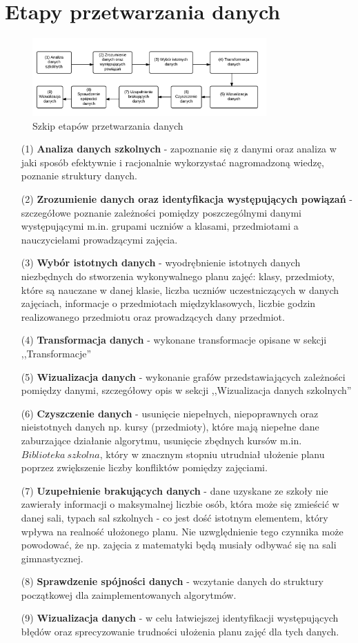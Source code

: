 \section{Etapy przetwarzania danych}
\begin{figure}[H]
  \centering
    \includegraphics[width=0.8\textwidth]{proces_przetwarzania.png}
  \caption{Szkip etapów przetwarzania danych}
\end{figure}
\begin{enumerate}
\item[(1)] \textbf{Analiza danych szkolnych} - zapoznanie się z danymi oraz analiza w jaki sposób efektywnie i racjonalnie wykorzystać nagromadzoną wiedzę, poznanie struktury danych.
\item[(2)] \textbf{Zrozumienie danych oraz identyfikacja występujących powiązań} - szczegółowe poznanie zależności pomiędzy poszczególnymi danymi występującymi m.in. grupami uczniów a klasami, przedmiotami a nauczycielami prowadzącymi zajęcia.
\item[(3)] \textbf{Wybór istotnych danych} - wyodrębnienie istotnych danych niezbędnych do stworzenia wykonywalnego planu zajęć: klasy, przedmioty, które są nauczane w danej klasie, liczba uczniów uczestniczących w danych zajęciach, informacje o przedmiotach międzyklasowych, liczbie godzin realizowanego przedmiotu oraz prowadzących dany przedmiot.
\item[(4)] \textbf{Transformacja danych} - wykonane transformacje opisane w sekcji ,,Transformacje''
\item[(5)] \textbf{Wizualizacja danych} - wykonanie grafów przedstawiających zależności pomiędzy danymi, szczegółowy opis w sekcji ,,Wizualizacja danych szkolnych''
\item[(6)] \textbf{Czyszczenie danych}  - usunięcie niepełnych, niepoprawnych oraz nieistotnych danych np. kursy (przedmioty), które mają niepełne dane zaburzające działanie algorytmu, usunięcie zbędnych kursów m.in. $Biblioteka\ szkolna$, który w znacznym stopniu utrudniał ułożenie planu poprzez zwiększenie liczby konfliktów pomiędzy zajęciami.
\item[(7)] \textbf{Uzupełnienie brakujących danych} - dane uzyskane ze szkoły nie zawierały informacji o maksymalnej liczbie osób, która może się zmieścić w danej sali, typach sal szkolnych - co jest dość istotnym elementem, który wpływa na realność ułożonego planu. Nie uzwględnienie tego czynnika może powodować, że np. zajęcia z matematyki będą musiały odbywać się na sali gimnastycznej. 
\item[(8)] \textbf{Sprawdzenie spójności danych} - wczytanie danych do struktury początkowej dla zaimplementowanych algorytmów.
\item[(9)] \textbf{Wizualizacja danych} - w celu łatwiejszej identyfikacji występujących błędów oraz sprecyzowanie trudności ułożenia planu zajęć dla tych danych.
\end{enumerate}
